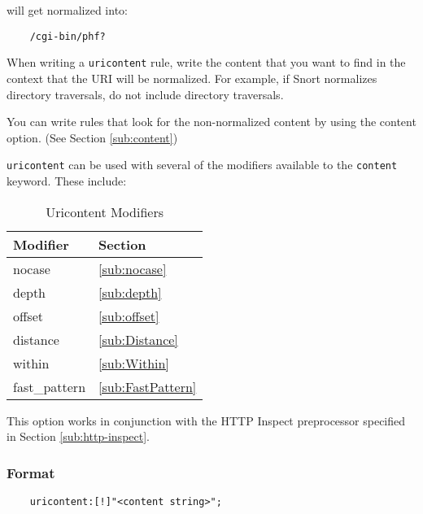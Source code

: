 \documentclass[english]{report}
\begin{document}
will get normalized into:

\begin{verbatim}
    /cgi-bin/phf?
\end{verbatim}

When writing a \texttt{uricontent} rule, write the content that you want to
find in the context that the URI will be normalized.  For example, if Snort
normalizes directory traversals, do not include directory traversals.  

You can write rules that look for the non-normalized content by using the
content option.  (See Section \ref{sub:content})

\texttt{uricontent} can be used with several of the modifiers available to the
\texttt{content} keyword.  These include:

\begin{table}[h]
\begin{center}
\caption{Uricontent Modifiers}
\label{Uricontent Modifiers}
\begin{tabular}{|p{1in}|p{1in}|}

\hline 
Modifier & Section \\
\hline

\hline 
nocase & \ref{sub:nocase} \\

\hline
depth & \ref{sub:depth} \\

\hline 
offset & \ref{sub:offset} \\

\hline
distance & \ref{sub:Distance} \\

\hline 
within & \ref{sub:Within} \\

\hline
fast\_pattern & \ref{sub:FastPattern} \\

\hline
\end{tabular}
\end{center}
\end{table}


This option works in conjunction with the HTTP Inspect preprocessor specified
in Section \ref{sub:http-inspect}.

\subsubsection{Format}

\begin{verbatim}
    uricontent:[!]"<content string>";
\end{verbatim}
\end{document}
